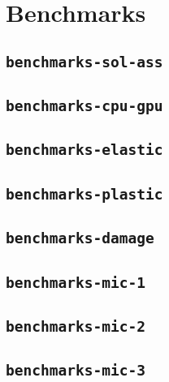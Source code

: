 
\section{Benchmarks}


\subsection{\texttt{benchmarks-sol-ass}}
\subsection{\texttt{benchmarks-cpu-gpu}}
\subsection{\texttt{benchmarks-elastic}}
\subsection{\texttt{benchmarks-plastic}}
\subsection{\texttt{benchmarks-damage}}
\subsection{\texttt{benchmarks-mic-1}}
\subsection{\texttt{benchmarks-mic-2}}
\subsection{\texttt{benchmarks-mic-3}}
